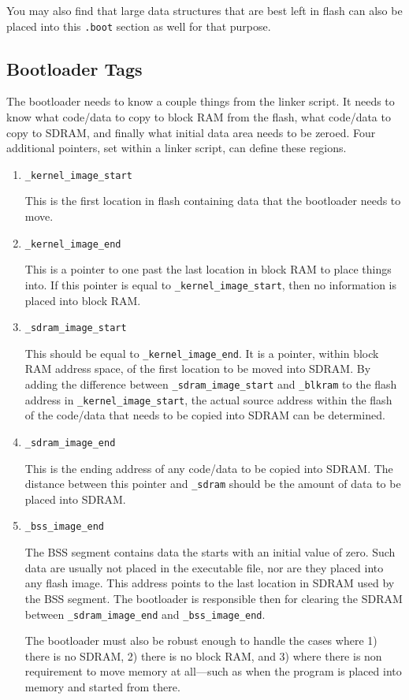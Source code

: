 \documentclass{gqtekspec}
\begin{document}
You may also find that large data structures that are best left in flash
can also be placed into this {\tt .boot} section as well for that purpose.

\subsection{Bootloader Tags}\label{sec:ld-boot}

The bootloader needs to know a couple things from the linker script.  It needs
to know what code/data to copy to block RAM from the flash, what code/data to
copy to SDRAM, and finally what initial data area needs to be zeroed.  Four
additional pointers, set within a linker script, can define these regions.

\begin{enumerate}
\item {\tt \_kernel\_image\_start}

	This is the first location in flash containing data that the bootloader
	needs to move.

\item {\tt \_kernel\_image\_end}

	This is a pointer to one past the last location in block RAM to place
	things into.  If this pointer is equal to {\tt \_kernel\_image\_start},
	then no information is placed into block RAM.

\item {\tt \_sdram\_image\_start}

	This should be equal to {\tt \_kernel\_image\_end}.  It is a pointer,
	within block RAM address space, of the first location to be moved
	into SDRAM.  By adding the difference between
	{\tt \_sdram\_image\_start} and {\tt \_blkram} to the flash address
	in {\tt \_kernel\_image\_start}, the actual source address within the
	flash of the code/data that needs to be copied into SDRAM can be
	determined.

\item {\tt \_sdram\_image\_end}

	This is the ending address of any code/data to be copied into SDRAM.
	The distance between this pointer and {\tt \_sdram} should be the 
	amount of data to be placed into SDRAM.

\item {\tt \_bss\_image\_end}

	The BSS segment contains data the starts with an initial value of
	zero.  Such data are usually not placed in the executable file, nor
	are they placed into any flash image.  This address points to the
	last location in SDRAM used by the BSS segment.  The bootloader
	is responsible then for clearing the SDRAM between
	{\tt \_sdram\_image\_end} and {\tt \_bss\_image\_end}.

	The bootloader must also be robust enough to handle the cases where
	1) there is no SDRAM, 2) there is no block RAM, and 3) where there
	is non requirement to move memory at all---such as when the program
	is placed into memory and started from there.
\end{enumerate}
\end{document}
